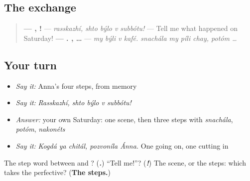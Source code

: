 \subsection*{The exchange}
\begin{quote}
\textbf{— ,    !} — \emph{rasskazhí, shto býlo v subbótu!} — Tell me what happened on Saturday! \textbf{—    .    ,  …} — \emph{my býli v kafé. snachála my píli chay, potóm …}
\end{quote}

\subsection*{Your turn}
\begin{itemize}
\raggedright
  \item \emph{Say it:} Anna's four steps, from memory
  \item \emph{Say it:} \emph{Rasskazhí, shto býlo v subbótu!}
  \item \emph{Answer:} your own Saturday: one scene, then three steps with \emph{snachála}, \emph{potóm}, \emph{nakonéts}
  \item \emph{Say it:} \emph{Kogdá ya chitál, pozvoníla Ánna.} One going on, one cutting in
\end{itemize}

\begin{tcolorbox}[breakable,colback=teal!4,colframe=teal!35!black,title={Before you move on}]
The step word between \emph{} and \emph{}? (\emph{\textbf{.}}) \textquotedblleft{}Tell me!\textquotedblright{}? (\emph{\textbf{!}}) The scene, or the steps: which takes the perfective? (\textbf{The steps.})
\end{tcolorbox}
